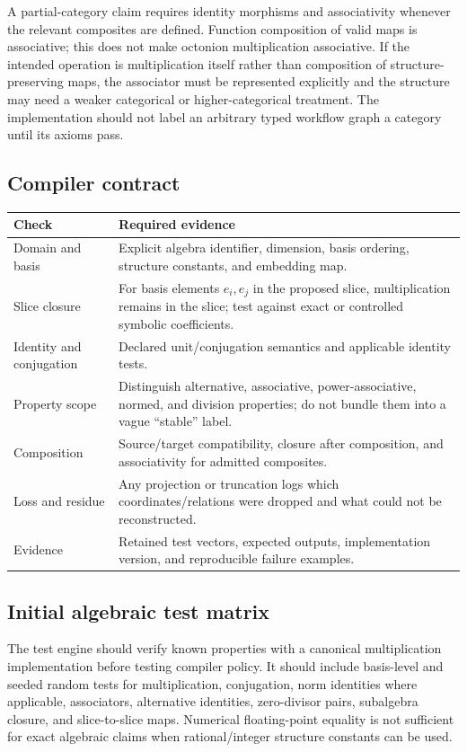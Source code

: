 \documentclass[11pt,oneside]{article}
\begin{document}
A partial-category claim requires identity morphisms and associativity whenever the relevant composites are defined. Function composition of valid maps is associative; this does not make octonion multiplication associative. If the intended operation is multiplication itself rather than composition of structure-preserving maps, the associator must be represented explicitly and the structure may need a weaker categorical or higher-categorical treatment. The implementation should not label an arbitrary typed workflow graph a category until its axioms pass.

\subsection{Compiler contract}
\begin{longtable}{p{}p{}}
\toprule
\textbf{Check} & \textbf{Required evidence} \\
\midrule
Domain and basis & Explicit algebra identifier, dimension, basis ordering, structure constants, and embedding map. \\
Slice closure & For basis elements $e_i,e_j$ in the proposed slice, multiplication remains in the slice; test against exact or controlled symbolic coefficients. \\
Identity and conjugation & Declared unit/conjugation semantics and applicable identity tests. \\
Property scope & Distinguish alternative, associative, power-associative, normed, and division properties; do not bundle them into a vague ``stable'' label. \\
Composition & Source/target compatibility, closure after composition, and associativity for admitted composites. \\
Loss and residue & Any projection or truncation logs which coordinates/relations were dropped and what could not be reconstructed. \\
Evidence & Retained test vectors, expected outputs, implementation version, and reproducible failure examples. \\
\bottomrule
\end{longtable}

\subsection{Initial algebraic test matrix}
The test engine should verify known properties with a canonical multiplication implementation before testing compiler policy. It should include basis-level and seeded random tests for multiplication, conjugation, norm identities where applicable, associators, alternative identities, zero-divisor pairs, subalgebra closure, and slice-to-slice maps. Numerical floating-point equality is not sufficient for exact algebraic claims when rational/integer structure constants can be used.
\end{document}
